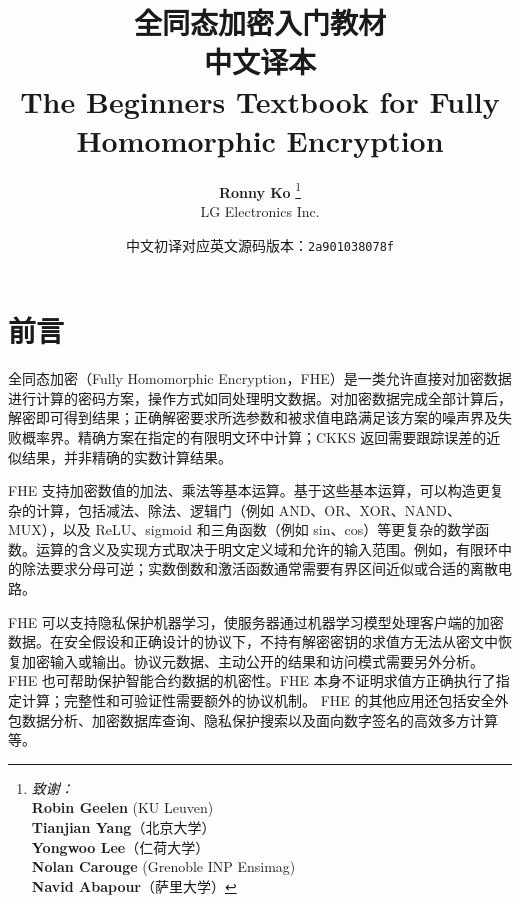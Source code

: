 \documentclass[11pt]{article}
\begin{document}
\title{\Huge{\textbf{全同态加密入门教材}}\\[0.6em]\Large{中文译本}\\[0.4em]\large{The Beginner\textquotesingle s Textbook for Fully Homomorphic Encryption}}
\author{
        \textbf{Ronny Ko} \thanks{\large \textit{致谢：}\\
        \textbf{Robin Geelen} (KU Leuven)\\  
        \textbf{Tianjian Yang}（北京大学）\\ \textbf{Yongwoo Lee}（仁荷大学）\\ \textbf{Nolan Carouge} (Grenoble INP Ensimag) \\
        \textbf{Navid Abapour}（萨里大学）
        }
        \\{LG Electronics Inc.}}%
\date{\small 中文初译对应英文源码版本：\texttt{2a901038078f}}



\begin{titlingpage}
\maketitle
\end{titlingpage}


\clearpage

\section*{前言}
全同态加密（Fully Homomorphic Encryption，FHE）是一类允许直接对加密数据进行计算的密码方案，操作方式如同处理明文数据。对加密数据完成全部计算后，解密即可得到结果；正确解密要求所选参数和被求值电路满足该方案的噪声界及失败概率界。精确方案在指定的有限明文环中计算；CKKS 返回需要跟踪误差的近似结果，并非精确的实数计算结果。

FHE 支持加密数值的加法、乘法等基本运算。基于这些基本运算，可以构造更复杂的计算，包括减法、除法、逻辑门（例如 AND、OR、XOR、NAND、MUX），以及 ReLU、sigmoid 和三角函数（例如 sin、cos）等更复杂的数学函数。运算的含义及实现方式取决于明文定义域和允许的输入范围。例如，有限环中的除法要求分母可逆；实数倒数和激活函数通常需要有界区间近似或合适的离散电路。

FHE 可以支持隐私保护机器学习，使服务器通过机器学习模型处理客户端的加密数据。在安全假设和正确设计的协议下，不持有解密密钥的求值方无法从密文中恢复加密输入或输出。协议元数据、主动公开的结果和访问模式需要另外分析。
FHE 也可帮助保护智能合约数据的机密性。FHE 本身不证明求值方正确执行了指定计算；完整性和可验证性需要额外的协议机制。
FHE 的其他应用还包括安全外包数据分析、加密数据库查询、隐私保护搜索以及面向数字签名的高效多方计算等。
\end{document}
